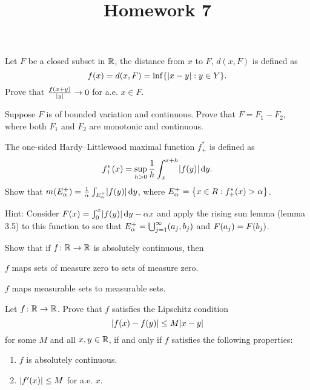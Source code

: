 \documentclass{../homework}
\title{Homework 7}
\author{}
\date{}
\begin{document}
\begin{problems}
\item Let \(F\) be a closed subset in \(\RR\), the distance from \(x\)
  to \(F\), \(d(x, F)\) is defined as
  \[
    f(x) = d(x, F) = \inf\set*{\abs{x-y} : y \in Y}.
  \]
  Prove that \(\frac{f(x+y)}{\abs y} \to 0\) for a.e. \(x \in F\).

  \begin{solution}
  \end{solution}

\item Suppose \(F\) is of bounded variation and continuous.  Prove
  that \(F = F_1 - F_2\), where both \(F_1\) and \(F_2\) are monotonic
  and continuous.

  \begin{solution}
  \end{solution}

\item The one-sided Hardy--Littlewood maximal function \(f_+^*\) is
  defined as
  \[
    f_+^*(x) = \sup_{h>0} \frac 1 h \int_x^{x+h} \abs{f(y)} \dif y.
  \]
  Show that
  \(m\prn*{E_\alpha^+} = \frac 1 \alpha \int_{E_\alpha^+} \abs{f(y)}
  \dif y\), where \(E_\alpha^+ = \set*{x \in R : f_+^*(x) > \alpha}\).

  Hint: Consider \(F(x) = \int_0^x \abs*{f(y)} \dif y - \alpha x\) and
  apply the rising sun lemma (lemma 3.5) to this function to see that
  \(E_\alpha^+ = \bigcup_{j=1}^\infty \prn*{a_j, b_j}\) and
  \(F\prn*{a_j} = F\prn*{b_j}\).

  \begin{solution}
  \end{solution}

\item Show that if \(f \colon \RR \to \RR\) is absolutely continuous,
  then
  \begin{problems}
  \item \(f\) maps sets of measure zero to sets of measure zero.
  \item \(f\) maps measurable sets to measurable sets.
  \end{problems}

  \begin{solution}
  \end{solution}

\item Let \(f \colon \RR \to \RR\).  Prove that \(f\) satisfies the
  Lipschitz condition
  \[
    \abs*{f(x) - f(y)} \le M \abs{x-y}
  \]
  for some \(M\) and all \(x, y \in \RR\), if and only if \(f\)
  satisfies the following properties:
  \begin{enumerate}[label=(\alph*)]
  \item \(f\) is absolutely continuous.
  \item \(\abs*{f'(x)} \le M\) for a.e. \(x\).
  \end{enumerate}


\end{problems}
\end{document}

